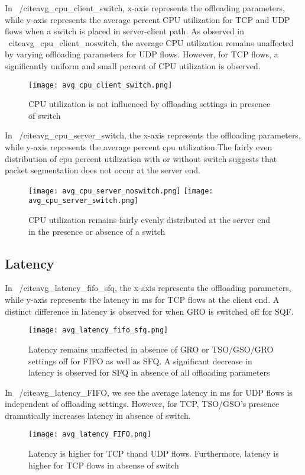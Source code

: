 \documentclass[letterpaper,twocolumn,10pt]{article}
\begin{document}
In ~/cite{avg_cpu_client_switch}, x-axis represents the offloading parameters,
   while y-axis represents the average percent CPU utilization for TCP and UDP
   flows when a switch is placed in server-client path. As observed in
   ~cite{avg_cpu_client_noswitch}, the average CPU utilization remains
   unaffected by varying offloading parameters for UDP flows. However, for TCP
   flows, a significantly uniform and small percent of CPU utilization is
   observed. 
\begin{figure}[t] 
\texttt{[image: avg\_cpu\_client\_switch.png]}
\caption{CPU utilization is not influenced by offloading settings in presence of
    switch} 
\label{fig:avg_cpu_client_switch} 
\end{figure}

In ~/cite{avg_cpu_server_switch}, the x-axis represents the offloading
parameters, while y-axis represents the average percent cpu utilization.The
fairly even distribution of cpu percent utilization with or without switch
suggests that packet segmentation does not occur at the server end.
\begin{figure}[t] 
\texttt{[image: avg\_cpu\_server\_noswitch.png]}
\texttt{[image: avg\_cpu\_server\_switch.png]} 
\caption{CPU utilization
    remains fairly evenly distributed at the server end in the presence or
        absence of a switch} 
\label{fig:avg_cpu_server_noswitch} 
\end{figure}

\subsection{Latency}
In ~/cite{avg_latency_fifo_sfq}, the x-axis represents the offloading parameters,
   while y-axis represents the latency in ms for TCP flows at the client end. A
   distinct difference in latency is observed for when GRO is switched off for
   SQF. 
\begin{figure}[t] \texttt{[image: avg\_latency\_fifo\_sfq.png]}
\caption{Latency remains unaffected in absence of GRO or TSO/GSO/GRO settings
    off for FIFO as well as SFQ. A significant decrease in latency is observed
        for SFQ in absence of all offloading parameters}
        \label{fig:avg_latency_fifo_sfq} \end{figure}

In ~/cite{avg_latency_FIFO}, we see the average latency in ms for UDP flows is
independent of offloading settings. However, for TCP, TSO/GSO's presence
dramatically increases latency in absence of switch. 
\begin{figure}[t] \texttt{[image: avg\_latency\_FIFO.png]}
\caption{Latency is higher for TCP thand UDP flows. Furthermore, latency is
    higher for TCP flows in absense of switch} \label{fig:avg_latency_FIFO}
    \end{figure}
\end{document}
